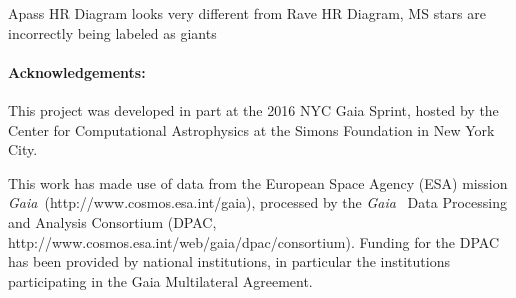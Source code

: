\documentclass[11pt,letterpaper]{article}
\newcommand{\acronym}[1]{{\small{#1}}}
\newcommand{\project}[1]{\textsl{#1}}
\newcommand{\Gaia}{\project{Gaia}}
\begin{document}
Apass HR Diagram looks very different from Rave HR Diagram, MS stars are incorrectly being labeled as giants

\paragraph{Acknowledgements:}
This project was developed in part at the 2016 NYC Gaia Sprint, hosted
by the Center for Computational Astrophysics at the Simons Foundation
in New York City.

This work has made use of data from the European Space Agency (ESA)
mission \Gaia\ (http://www.cosmos.esa.int/gaia), processed by the \Gaia\ %
Data Processing and Analysis Consortium (\acronym{DPAC},
http://www.cosmos.esa.int/web/gaia/dpac/consortium). Funding for the
\acronym{DPAC} has been provided by national institutions, in particular the
institutions participating in the Gaia Multilateral Agreement.
\end{document}
